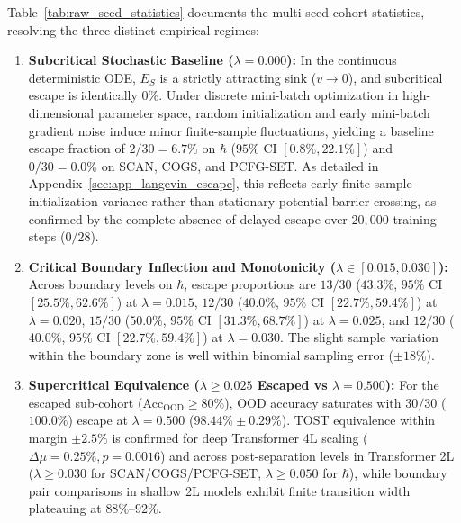 \documentclass{article}
\theoremstyle{plain}
\theoremstyle{definition}
\begin{document}
Table~\ref{tab:raw_seed_statistics} documents the multi-seed cohort statistics, resolving the three distinct empirical regimes:
\begin{enumerate}[leftmargin=*,noitemsep]
    \item \textbf{Subcritical Stochastic Baseline ($\lambda=0.000$):} In the continuous deterministic ODE, $E_S$ is a strictly attracting sink ($v \to 0$), and subcritical escape is identically $0\%$. Under discrete mini-batch optimization in high-dimensional parameter space, random initialization and early mini-batch gradient noise induce minor finite-sample fluctuations, yielding a baseline escape fraction of $2/30 = 6.7\%$ on $\hbar$ ($95\%$ CI $[0.8\%, 22.1\%]$) and $0/30 = 0.0\%$ on SCAN, COGS, and PCFG-SET. As detailed in Appendix~\ref{sec:app_langevin_escape}, this reflects early finite-sample initialization variance rather than stationary potential barrier crossing, as confirmed by the complete absence of delayed escape over $20{,}000$ training steps ($0/28$).
    \item \textbf{Critical Boundary Inflection and Monotonicity ($\lambda \in [0.015, 0.030]$):} Across boundary levels on $\hbar$, escape proportions are $13/30$ ($43.3\%$, $95\%$ CI $[25.5\%, 62.6\%]$) at $\lambda=0.015$, $12/30$ ($40.0\%$, $95\%$ CI $[22.7\%, 59.4\%]$) at $\lambda=0.020$, $15/30$ ($50.0\%$, $95\%$ CI $[31.3\%, 68.7\%]$) at $\lambda=0.025$, and $12/30$ ($40.0\%$, $95\%$ CI $[22.7\%, 59.4\%]$) at $\lambda=0.030$. The slight sample variation within the boundary zone is well within binomial sampling error ($\pm 18\%$).
    \item \textbf{Supercritical Equivalence ($\lambda \ge 0.025$ Escaped vs $\lambda = 0.500$):} For the escaped sub-cohort ($\text{Acc}_{\text{OOD}} \ge 80\%$), OOD accuracy saturates with $30/30$ ($100.0\%$) escape at $\lambda = 0.500$ ($98.44\% \pm 0.29\%$). TOST equivalence within margin $\pm 2.5\%$ is confirmed for deep Transformer 4L scaling ($\Delta\mu = 0.25\%, p = 0.0016$) and across post-separation levels in Transformer 2L ($\lambda \ge 0.030$ for SCAN/COGS/PCFG-SET, $\lambda \ge 0.050$ for $\hbar$), while boundary pair comparisons in shallow 2L models exhibit finite transition width plateauing at $88\%$--$92\%$.
\end{enumerate}
\end{document}
